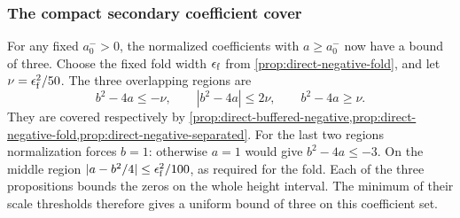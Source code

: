 \subsubsection{The compact secondary coefficient cover}

For any fixed \(a_0^->0\), the normalized coefficients
with \(a\ge a_0^-\) now have a bound of three.
Choose the fixed fold width \(\epsilon_{\rm f}\) from
\cref{prop:direct-negative-fold}, and let \(\nu=\epsilon_{\rm f}^2/50\).
The three overlapping regions are
\[
 b^2-4a\le-\nu,\qquad |b^2-4a|\le2\nu,\qquad b^2-4a\ge\nu .
\]
They are covered respectively by
\cref{prop:direct-buffered-negative,prop:direct-negative-fold,prop:direct-negative-separated}.
For the last two regions normalization forces \(b=1\):
otherwise \(a=1\) would give \(b^2-4a\le-3\).
On the middle region
\mbox{\(|a-b^2/4|\le\epsilon_{\rm f}^2/100\)}, as required for the fold.
Each of the three propositions bounds the zeros on the whole height
interval. The minimum of their scale thresholds therefore gives a
uniform bound of three on this coefficient set.
